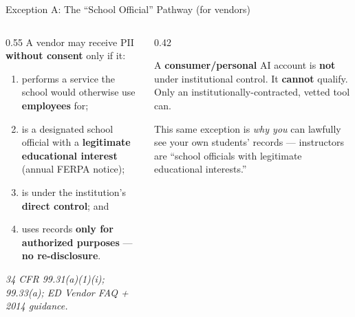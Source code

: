 \documentclass[aspectratio=169, 10pt]{beamer}
\newcommand{\cmcite}[1]{{\scriptsize\color{CoolGray}\textit{#1}}}
\begin{document}
\begin{frame}{Exception A: The ``School Official'' Pathway (for vendors)}
\vskip-2pt
\begin{columns}[T]
\begin{column}{0.55\textwidth}
\small A vendor may receive PII \textbf{without consent} only if it:
\vskip3pt
\begin{enumerate}\setlength{\itemsep}{2pt}
  \item performs a service the school would otherwise use \textbf{employees} for;
  \item is a designated school official with a \textbf{legitimate educational interest} (annual FERPA notice);
  \item is under the institution's \textbf{direct control}; and
  \item uses records \textbf{only for authorized purposes} --- \textbf{no re-disclosure}.
\end{enumerate}
\vskip4pt
\cmcite{34 CFR 99.31(a)(1)(i); 99.33(a); ED Vendor FAQ + 2014 guidance.}
\end{column}
\begin{column}{0.42\textwidth}
\begin{tcolorbox}[coralbox, title={\faTimesCircle\quad Bottom line}, top=3pt, bottom=3pt]
\small A \textbf{consumer/personal} AI account is \textbf{not} under institutional control. It \textbf{cannot} qualify.
\vskip3pt
Only an institutionally-contracted, vetted tool can.
\end{tcolorbox}
\vskip4pt
\begin{tcolorbox}[quotebox, top=3pt, bottom=3pt]
\scriptsize This same exception is \emph{why you} can lawfully see your own students' records --- instructors are ``school officials with legitimate educational interests.''
\end{tcolorbox}
\end{column}
\end{columns}
\end{frame}
\end{document}
